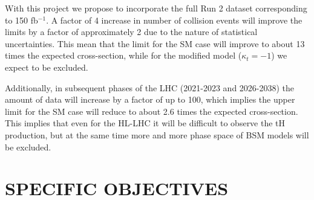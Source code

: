 \documentclass[final,3p]{CSP}
\begin{document}
With this project we propose to incorporate the full Run 2 dataset corresponding to 150 fb$^{-1}$.
A factor of 4 increase in number of collision events will improve the limits by a factor of approximately 2 due to the nature of statistical uncertainties.
This mean that the limit for the SM case will improve to about 13 times the expected cross-section, while for the modified model ($\kappa_t = -1$) we expect to be excluded.

Additionally, in subsequent phases of the LHC (2021-2023 and 2026-2038) the amount of data will increase by a factor of up to 100, which implies the upper limit for the SM case will reduce to about 2.6 times the expected cross-section. This implies that even for the HL-LHC it will be difficult to observe the tH production, but at the same time more and more phase space of BSM models will be excluded.  

\section{SPECIFIC OBJECTIVES}

\onehalfspacing 

\end{document}
